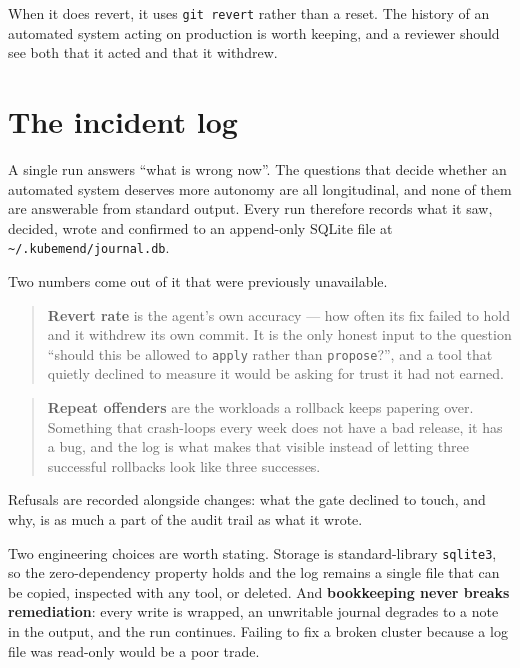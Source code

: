 \documentclass[11pt,a4paper]{article}
\newcommand{\code}[1]{\texttt{\small #1}}
\begin{document}
When it does revert, it uses \code{git revert} rather than a reset. The history
of an automated system acting on production is worth keeping, and a reviewer
should see both that it acted and that it withdrew.

\section{The incident log}
\label{sec:journal}

A single run answers ``what is wrong now''. The questions that decide whether an
automated system deserves more autonomy are all longitudinal, and none of them
are answerable from standard output. Every run therefore records what it saw,
decided, wrote and confirmed to an append-only SQLite file at
\code{\~{}/.kubemend/journal.db}.

Two numbers come out of it that were previously unavailable.

\begin{quote}
\textbf{Revert rate} is the agent's own accuracy --- how often its fix failed to
hold and it withdrew its own commit. It is the only honest input to the question
``should this be allowed to \code{apply} rather than \code{propose}?'', and a
tool that quietly declined to measure it would be asking for trust it had not
earned.
\end{quote}

\begin{quote}
\textbf{Repeat offenders} are the workloads a rollback keeps papering over.
Something that crash-loops every week does not have a bad release, it has a bug,
and the log is what makes that visible instead of letting three successful
rollbacks look like three successes.
\end{quote}

Refusals are recorded alongside changes: what the gate declined to touch, and
why, is as much a part of the audit trail as what it wrote.

Two engineering choices are worth stating. Storage is standard-library
\code{sqlite3}, so the zero-dependency property holds and the log remains a
single file that can be copied, inspected with any tool, or deleted. And
\textbf{bookkeeping never breaks remediation}: every write is wrapped, an
unwritable journal degrades to a note in the output, and the run continues.
Failing to fix a broken cluster because a log file was read-only would be a poor
trade.
\end{document}
